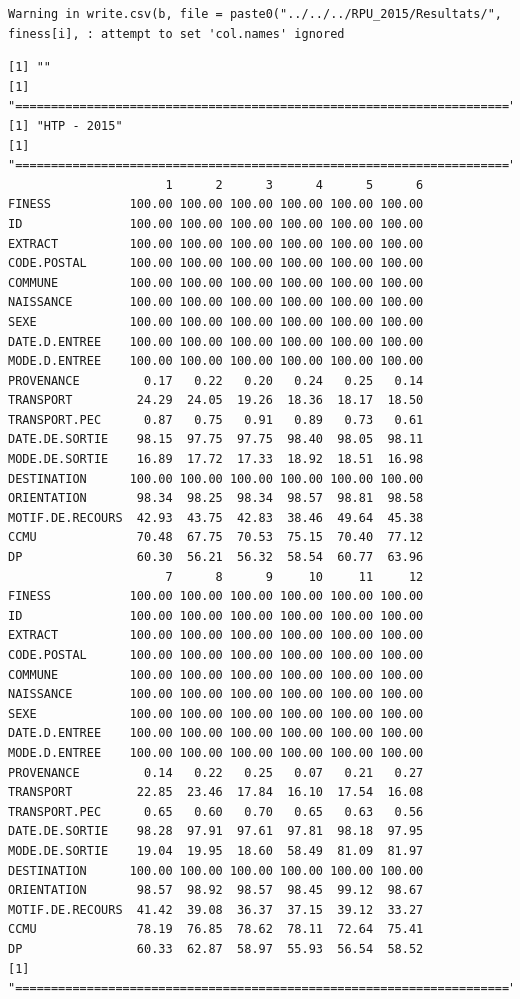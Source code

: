 \documentclass[]{article}
\begin{document}
\begin{verbatim}
Warning in write.csv(b, file = paste0("../../../RPU_2015/Resultats/",
finess[i], : attempt to set 'col.names' ignored
\end{verbatim}

\begin{verbatim}
[1] ""
[1] "====================================================================="
[1] "HTP - 2015"
[1] "====================================================================="
                      1      2      3      4      5      6
FINESS           100.00 100.00 100.00 100.00 100.00 100.00
ID               100.00 100.00 100.00 100.00 100.00 100.00
EXTRACT          100.00 100.00 100.00 100.00 100.00 100.00
CODE.POSTAL      100.00 100.00 100.00 100.00 100.00 100.00
COMMUNE          100.00 100.00 100.00 100.00 100.00 100.00
NAISSANCE        100.00 100.00 100.00 100.00 100.00 100.00
SEXE             100.00 100.00 100.00 100.00 100.00 100.00
DATE.D.ENTREE    100.00 100.00 100.00 100.00 100.00 100.00
MODE.D.ENTREE    100.00 100.00 100.00 100.00 100.00 100.00
PROVENANCE         0.17   0.22   0.20   0.24   0.25   0.14
TRANSPORT         24.29  24.05  19.26  18.36  18.17  18.50
TRANSPORT.PEC      0.87   0.75   0.91   0.89   0.73   0.61
DATE.DE.SORTIE    98.15  97.75  97.75  98.40  98.05  98.11
MODE.DE.SORTIE    16.89  17.72  17.33  18.92  18.51  16.98
DESTINATION      100.00 100.00 100.00 100.00 100.00 100.00
ORIENTATION       98.34  98.25  98.34  98.57  98.81  98.58
MOTIF.DE.RECOURS  42.93  43.75  42.83  38.46  49.64  45.38
CCMU              70.48  67.75  70.53  75.15  70.40  77.12
DP                60.30  56.21  56.32  58.54  60.77  63.96
                      7      8      9     10     11     12
FINESS           100.00 100.00 100.00 100.00 100.00 100.00
ID               100.00 100.00 100.00 100.00 100.00 100.00
EXTRACT          100.00 100.00 100.00 100.00 100.00 100.00
CODE.POSTAL      100.00 100.00 100.00 100.00 100.00 100.00
COMMUNE          100.00 100.00 100.00 100.00 100.00 100.00
NAISSANCE        100.00 100.00 100.00 100.00 100.00 100.00
SEXE             100.00 100.00 100.00 100.00 100.00 100.00
DATE.D.ENTREE    100.00 100.00 100.00 100.00 100.00 100.00
MODE.D.ENTREE    100.00 100.00 100.00 100.00 100.00 100.00
PROVENANCE         0.14   0.22   0.25   0.07   0.21   0.27
TRANSPORT         22.85  23.46  17.84  16.10  17.54  16.08
TRANSPORT.PEC      0.65   0.60   0.70   0.65   0.63   0.56
DATE.DE.SORTIE    98.28  97.91  97.61  97.81  98.18  97.95
MODE.DE.SORTIE    19.04  19.95  18.60  58.49  81.09  81.97
DESTINATION      100.00 100.00 100.00 100.00 100.00 100.00
ORIENTATION       98.57  98.92  98.57  98.45  99.12  98.67
MOTIF.DE.RECOURS  41.42  39.08  36.37  37.15  39.12  33.27
CCMU              78.19  76.85  78.62  78.11  72.64  75.41
DP                60.33  62.87  58.97  55.93  56.54  58.52
[1] "====================================================================="
\end{verbatim}
\end{document}
